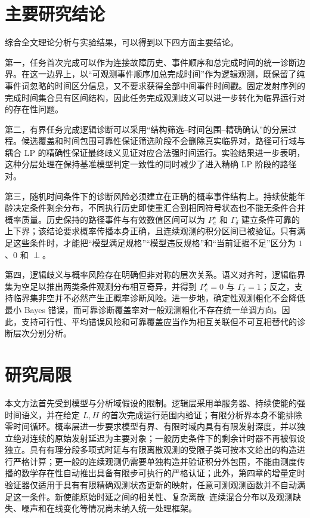 \documentclass[master,fontset=ubuntu]{shnuthesis}
\DeclareRobustCommand{\probstatus}[1]{\ensuremath{#1}}
\theoremstyle{definition}
\begin{document}
\section{主要研究结论}

综合全文理论分析与实验结果，可以得到以下四方面主要结论。

第一，任务首次完成可以作为连接故障历史、事件顺序和总完成时间的统一诊断边界。在这一边界上，以“可观测事件顺序加总完成时间”作为逻辑观测，既保留了纯事件词忽略的时间区分信息，又不要求获得全部中间事件时间戳。固定发射序列的完成时间集合具有区间结构，因此任务完成观测歧义可以进一步转化为临界运行对的存在性问题。

第二，有界任务完成逻辑诊断可以采用“结构筛选--时间包围--精确确认”的分层过程。候选覆盖和时间包围可靠性保证筛选阶段不会删除真实临界对，路径可行域与耦合 LP 的精确性保证最终歧义见证对应合法强时间运行。实验结果进一步表明，这种分层处理在保持基准模型判定一致性的同时减少了进入精确 LP 阶段的路径对。

第三，随机时间条件下的诊断风险必须建立在正确的概率事件结构上。持续使能年龄决定条件剩余分布，不同执行历史即使重汇合到相同符号状态也不能无条件合并概率质量。历史保持的路径事件与有效数值区间可以为 \(P_e^\star\) 和 \(\Gamma_\delta\) 建立条件可靠的上下界；该结论要求概率传播本身正确，且连续观测的积分区间已被验证。只有满足这些条件时，才能把“模型满足规格”“模型违反规格”和“当前证据不足”区分为 \probstatus{1}、\probstatus{0} 和 \probstatus{\perp}。

第四，逻辑歧义与概率风险存在明确但非对称的层次关系。语义对齐时，逻辑临界集为空足以推出两类条件观测分布相互奇异，并得到 \(P_e^\star=0\) 与 \(\Gamma_\delta=1\)；反之，支持临界集非空并不必然产生正概率诊断风险。进一步地，确定性观测粗化不会降低最小 Bayes 错误，而可靠诊断覆盖率对一般观测粗化不存在统一单调方向。因此，支持可行性、平均错误风险和可靠覆盖应当作为相互关联但不可互相替代的诊断层次分别分析。

\section{研究局限}

本文方法首先受到模型与分析域假设的限制。逻辑层采用单服务器、持续使能的强时间语义，并在给定 \(L,H\) 的首次完成运行范围内验证；有限分析界本身不能排除零时间循环。概率层进一步要求模型有界、有限时域内具有有限发射深度，并以独立绝对连续的原始发射延迟为主要对象；一般历史条件下的剩余计时器不再被假设独立。具有有理分段多项式时延与有限离散观测的受限子类可按本文给出的构造进行严格计算；更一般的连续观测仍需要单独构造并验证积分外包围，不能由测度传播的数学存在性自动推出具备有限步可执行的严格认证；此外，第四章的增量定时验证器仅适用于具有有限精确观测状态更新的映射，任意可测观测函数并不自动满足这一条件。新使能原始时延之间的相关性、复杂离散--连续混合分布以及观测缺失、噪声和在线变化等情况尚未纳入统一处理框架。
\end{document}
